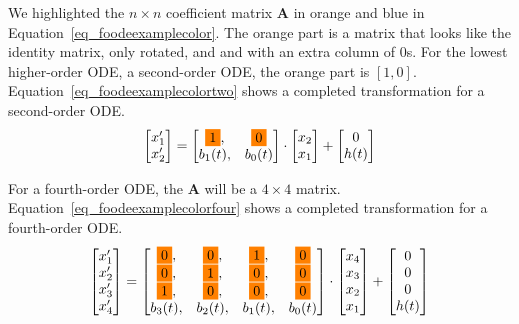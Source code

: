 We highlighted the $n \times n$ coefficient matrix \textbf{A} in orange and blue in Equation~\ref{eq_foodeexamplecolor}. The orange part is a matrix that looks like the identity matrix, only rotated, and and with an extra column of 0s. For the lowest higher-order ODE, a second-order ODE, the orange part is $[1, 0]$. Equation~\ref{eq_foodeexamplecolortwo} shows a completed transformation for a second-order ODE.
\begin{equation} \label{eq_foodeexamplecolortwo}
	\begin{bmatrix}
		{x_{1}'} \\
    {x_{2}'} 
	\end{bmatrix}
    = 
  \begin{bmatrix}
		\highlight{orange}{1}, & \highlight{orange}{0} \\
    {b_{1}(t)}, & {b_{0}(t)}
	\end{bmatrix}
    \cdot
  \begin{bmatrix}
		{x_{2}} \\
    {x_{1}} 
	\end{bmatrix}
    + 
  \begin{bmatrix}
    {0} \\
    {h(t)}
	\end{bmatrix}
\end{equation}

For a fourth-order ODE, the \textbf{A} will be a $4 \times 4$ matrix. Equation~\ref{eq_foodeexamplecolorfour} shows a completed transformation for a fourth-order ODE.
\begin{equation} \label{eq_foodeexamplecolorfour}
	\begin{bmatrix}
		{x_{1}'} \\
    {x_{2}'} \\
    {x_{3}'} \\
    {x_{4}'}
	\end{bmatrix}
    = 
  \begin{bmatrix}
		\highlight{orange}{0}, & \highlight{orange}{0}, & \highlight{orange}{1}, & \highlight{orange}{0} \\
    \highlight{orange}{0}, & \highlight{orange}{1}, & \highlight{orange}{0}, & \highlight{orange}{0} \\
    \highlight{orange}{1}, & \highlight{orange}{0}, & \highlight{orange}{0}, & \highlight{orange}{0} \\
    {b_{3}(t)}, & {b_{2}(t)}, & {b_{1}(t)}, & {b_{0}(t)}
	\end{bmatrix}
    \cdot
  \begin{bmatrix}
		{x_{4}} \\
    {x_{3}} \\
    {x_{2}} \\
    {x_{1}}
	\end{bmatrix}
    + 
  \begin{bmatrix}
    {0} \\
    {0} \\
    {0} \\
    {h(t)}
	\end{bmatrix}
\end{equation}

